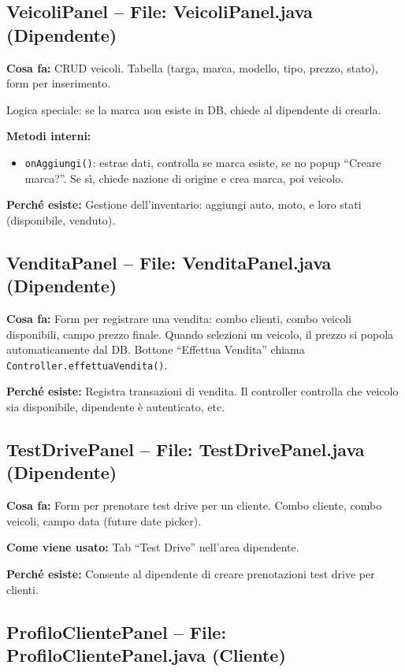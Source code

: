 \documentclass[12pt,a4paper]{article}
\begin{document}
\subsection{VeicoliPanel -- File: VeicoliPanel.java (Dipendente)}

\textbf{Cosa fa:}
CRUD veicoli. Tabella (targa, marca, modello, tipo, prezzo, stato), form per inserimento.

Logica speciale: se la marca non esiste in DB, chiede al dipendente di crearla.

\textbf{Metodi interni:}
\begin{itemize}
  \item \texttt{onAggiungi()}: estrae dati, controlla se marca esiste, se no popup ``Creare marca?''.
    Se sì, chiede nazione di origine e crea marca, poi veicolo.
\end{itemize}

\textbf{Perché esiste:}
Gestione dell'inventario: aggiungi auto, moto, e loro stati (disponibile, venduto).

\subsection{VenditaPanel -- File: VenditaPanel.java (Dipendente)}

\textbf{Cosa fa:}
Form per registrare una vendita: combo clienti, combo veicoli disponibili, campo prezzo finale.
Quando selezioni un veicolo, il prezzo si popola automaticamente dal DB.
Bottone ``Effettua Vendita'' chiama \texttt{Controller.effettuaVendita()}.

\textbf{Perché esiste:}
Registra transazioni di vendita. Il controller controlla che veicolo sia disponibile, dipendente è autenticato, etc.

\subsection{TestDrivePanel -- File: TestDrivePanel.java (Dipendente)}

\textbf{Cosa fa:}
Form per prenotare test drive per un cliente.
Combo cliente, combo veicoli, campo data (future date picker).

\textbf{Come viene usato:}
Tab ``Test Drive'' nell'area dipendente.

\textbf{Perché esiste:}
Consente al dipendente di creare prenotazioni test drive per clienti.

\subsection{ProfiloClientePanel -- File: ProfiloClientePanel.java (Cliente)}
\end{document}
